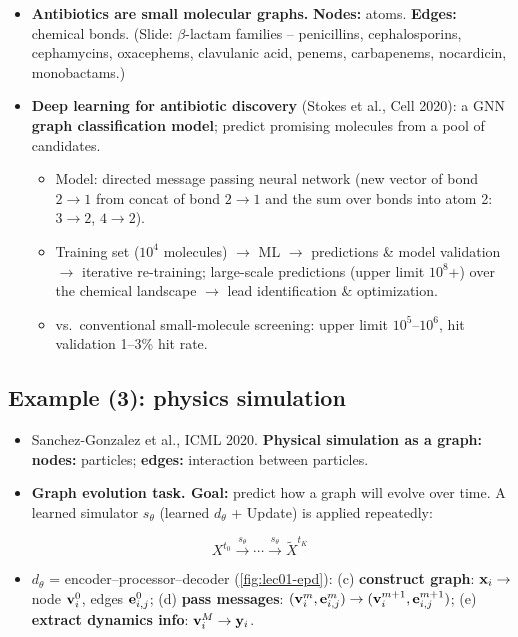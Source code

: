 \begin{itemize}
  \item \textbf{Antibiotics are small molecular graphs.} \textbf{Nodes:} atoms.
    \textbf{Edges:} chemical bonds. (Slide: $\beta$-lactam families -- penicillins,
    cephalosporins, cephamycins, oxacephems, clavulanic acid, penems, carbapenems,
    nocardicin, monobactams.)
  \item \textbf{Deep learning for antibiotic discovery} (Stokes et al., Cell 2020): a GNN
    \textbf{graph classification model}; predict promising molecules from a pool of
    candidates.
    \begin{itemize}
      \item Model: directed message passing neural network (new vector of bond $2\!\to\!1$
        from concat of bond $2\!\to\!1$ and the sum over bonds into atom 2: $3\!\to\!2$,
        $4\!\to\!2$).
      \item Training set ($10^4$ molecules) $\to$ ML $\to$ predictions \& model validation
        $\to$ iterative re-training; large-scale predictions (upper limit $10^8$+) over the
        chemical landscape $\to$ lead identification \& optimization.
      \item vs.\ conventional small-molecule screening: upper limit $10^5$--$10^6$, hit
        validation 1--3\% hit rate.
    \end{itemize}
\end{itemize}

\subsection{Example (3): physics simulation}\label{sec:lec01-physics}

\begin{itemize}
  \item Sanchez-Gonzalez et al., ICML 2020. \textbf{Physical simulation as a graph:}
    \textbf{nodes:} particles; \textbf{edges:} interaction between particles.
  \item \textbf{Graph evolution task. Goal:} predict how a graph will evolve over time.
    A learned simulator $s_\theta$ (learned $d_\theta$ + Update) is applied repeatedly:
\end{itemize}
\begin{equation}\label{eq:lec01-rollout}
  X^{t_0} \xrightarrow{\;s_\theta\;} \cdots \xrightarrow{\;s_\theta\;} \tilde X^{t_K}
\end{equation}
\begin{itemize}
  \item $d_\theta$ = encoder--processor--decoder (\cref{fig:lec01-epd}):
    (c) \textbf{construct graph}: $\mathbf{x}_i \to$ node $\mathbf{v}_i^0$, edges $\mathbf{e}_{i,j}^0$;
    (d) \textbf{pass messages}: $(\mathbf{v}_i^m, \mathbf{e}_{i,j}^m) \to (\mathbf{v}_i^{m+1}, \mathbf{e}_{i,j}^{m+1})$;
    (e) \textbf{extract dynamics info}: $\mathbf{v}_i^M \to \mathbf{y}_i$.
\end{itemize}

